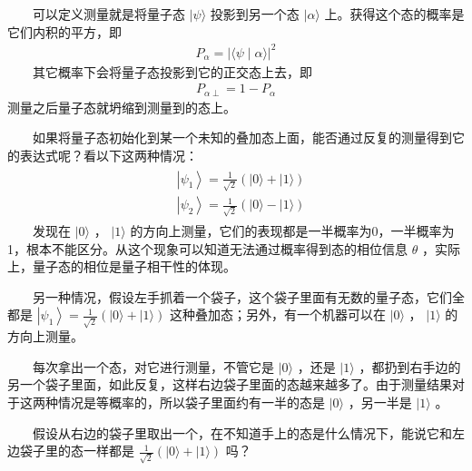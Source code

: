 \documentclass[a4paper,11pt,english]{sphinxmanual}
\begin{document}
\sphinxAtStartPar
  可以定义测量就是将量子态 \(|\psi\rangle\) 投影到另一个态 \(|\alpha\rangle\) 上。获得这个态的概率是它们内积的平方，即
\begin{equation*}
\begin{split}P_{\alpha}=|\langle\psi \mid \alpha\rangle|^{2}\end{split}
\end{equation*}
\sphinxAtStartPar
  其它概率下会将量子态投影到它的正交态上去，即
\begin{equation*}
\begin{split}P_{\alpha \perp}=1-P_{\alpha}\end{split}
\end{equation*}
\sphinxAtStartPar
测量之后量子态就坍缩到测量到的态上。

\sphinxAtStartPar
{}

\sphinxAtStartPar
  如果将量子态初始化到某一个未知的叠加态上面，能否通过反复的测量得到它的表达式呢？看以下这两种情况：
\begin{equation*}
\begin{split}\begin{aligned} &\left|\psi_{1}\right\rangle=\frac{1}{\sqrt{2}}(|0\rangle+|1\rangle) \\ &\left|\psi_{2}\right\rangle=\frac{1}{\sqrt{2}}(|0\rangle-|1\rangle) \end{aligned}\end{split}
\end{equation*}
\sphinxAtStartPar
  发现在 \(|0\rangle\) ， \(|1\rangle\) 的方向上测量，它们的表现都是一半概率为0，一半概率为1，根本不能区分。从这个现象可以知道无法通过概率得到态的相位信息  \(\theta\) ，实际上，量子态的相位是量子相干性的体现。

\sphinxAtStartPar
  另一种情况，假设左手抓着一个袋子，这个袋子里面有无数的量子态，它们全都是  \(\left|\psi_{1}\right\rangle=\frac{1}{\sqrt{2}}(|0\rangle+|1\rangle)\) 这种叠加态；另外，有一个机器可以在 \(|0\rangle\) ， \(|1\rangle\) 的方向上测量。

\sphinxAtStartPar
  每次拿出一个态，对它进行测量，不管它是 \(|0\rangle\) ，还是 \(|1\rangle\) ，都扔到右手边的另一个袋子里面，如此反复，这样右边袋子里面的态越来越多了。由于测量结果对于这两种情况是等概率的，所以袋子里面约有一半的态是 \(|0\rangle\) ，另一半是 \(|1\rangle\) 。

\sphinxAtStartPar
  假设从右边的袋子里取出一个，在不知道手上的态是什么情况下，能说它和左边袋子里的态一样都是 \(\frac{1}{\sqrt{2}}(|0\rangle+|1\rangle)\) 吗？
\end{document}
